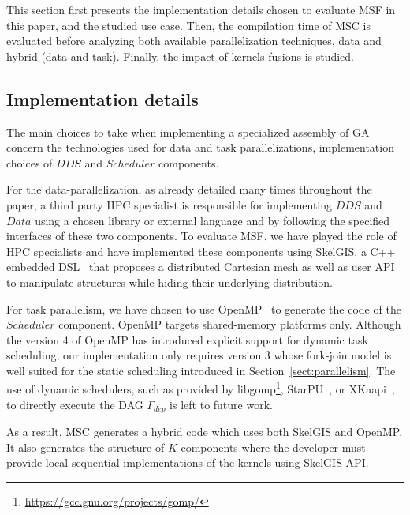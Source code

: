 This section first presents the implementation details chosen to evaluate MSF in this paper, and the studied use case. Then, the compilation time of MSC is evaluated before analyzing both available parallelization techniques, data and hybrid (data and task). Finally, the impact of kernels fusions is studied.

\subsection{Implementation details}

The main choices to take when implementing a specialized assembly of GA concern the technologies used for data and task parallelizations, \ie implementation choices of $DDS$ and $Scheduler$ components.

For the data-parallelization, as already detailed many times throughout the paper, a third party HPC specialist is responsible for implementing $DDS$ and $Data$ using a chosen library or external language and by following the specified interfaces of these two components. To evaluate MSF, we have played the role of HPC specialists and have implemented these components using SkelGIS, a C++ embedded DSL~\cite{CPE:CPE3494} that proposes a distributed Cartesian mesh as well as user API to manipulate structures while hiding their underlying distribution.

For task parallelism, we have chosen to use OpenMP~\cite{660313} to generate the code of the $Scheduler$ component. OpenMP targets shared-memory platforms only. Although the version 4 of OpenMP has introduced explicit support for dynamic task scheduling, our implementation only requires version 3 whose fork-join model is well suited for the static scheduling introduced in Section~\ref{sect:parallelism}.
The use of dynamic schedulers, such as provided by libgomp\footnote{\url{https://gcc.gnu.org/projects/gomp/}}, StarPU~\cite{Augonnet2011}, or XKaapi~\cite{Gautier:2013:XRS:2510661.2511383}, to directly execute the DAG $\Gamma_{dep}$ is left to future work.

As a result, MSC generates a hybrid code which uses both SkelGIS and OpenMP.
It also generates the structure of $K$ components where the developer must provide local sequential implementations of the kernels using SkelGIS API.

